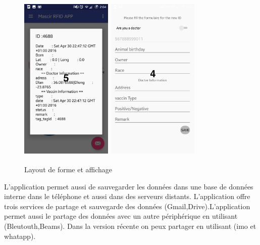 \documentclass[11pt, a4paper, twoside]{book}
\begin{document}
\begin{figure}[H]
\centering
\includegraphics[width=4.4cm,height=8cm]{showdialog}
\includegraphics[width=4.4cm,height=8cm]{form}
\caption{Layout de forme et affichage}
\end{figure}

L'application permet aussi de sauvegarder les données dans une base de données interne dans le téléphone et aussi dans des serveurs distants. L'application offre trois services de partage et sauvegarde des données (Gmail,Drive).L'application permet aussi le partage des données avec un autre périphérique en utilisant (Bleutouth,Beams). Dans la version récente on peux partager en utilisant (imo et whatapp).
 
\end{document}
